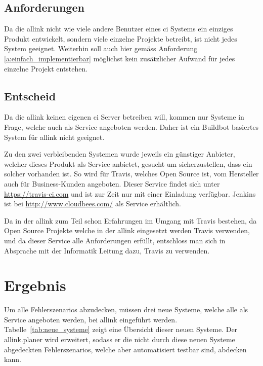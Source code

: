 \subsection{Anforderungen}
\label{sub:anforderungen}
Da die allink nicht wie viele andere Benutzer eines \acrshort{ci} Systems ein einziges Produkt entwickelt, sondern viele einzelne Projekte betreibt, ist nicht jedes System geeignet. Weiterhin soll auch hier gemäss Anforderung \ref{a:einfach_implementierbar} möglichst kein zusätzlicher Aufwand für jedes einzelne Projekt entstehen.

\subsection{Entscheid}
\label{sub:entscheid_ci}
Da die allink keinen eigenen \acrshort{ci} Server betreiben will, kommen nur Systeme in Frage, welche auch als Service angeboten werden. Daher ist ein Buildbot basiertes System für allink nicht geeignet.

Zu den zwei verbleibenden Systemen wurde jeweils ein günstiger Anbieter, welcher dieses Produkt als Service anbietet, gesucht um sicherzustellen, dass ein solcher vorhanden ist. So wird für Travis, welches Open Source ist, vom Hersteller auch für Business-Kunden angeboten. Dieser Service findet sich unter \url{https://travis-ci.com} und ist zur Zeit nur mit einer Einladung verfügbar. Jenkins ist bei \url{http://www.cloudbees.com/} als Service erhältlich.
 
Da in der allink zum Teil schon Erfahrungen im Umgang mit Travis bestehen, da Open Source Projekte welche in der allink eingesetzt werden Travis verwenden, und da dieser Service alle Anforderungen erfüllt, entschloss man sich in Absprache mit der Informatik Leitung dazu, Travis zu verwenden.

\section{Ergebnis}
\label{sec:ergebnis}
Um alle Fehlerszenarios abzudecken, müssen drei neue Systeme, welche alle als Service angeboten werden, bei allink eingeführt werden. Tabelle~\ref{tab:neue_systeme} zeigt eine Übersicht dieser neuen Systeme. Der allink.planer wird erweitert, sodass er die nicht durch diese neuen Systeme abgedeckten Fehlerszenarios, welche aber automatisiert testbar sind, abdecken kann.

\makeatletter
{} \setcounter{lnumber}{0}
\renewcommand\thelnumber{L\arabic{lnumber}}
\newcommand{\newlnumber}[3]%
{%
\midrule%
\refstepcounter{lnumber}%
\expandafter\xdef\csname l#2\endcsname {#1}%
\thelnumber\label{l:#2} & #1 & #3 \\
}
\makeatother

